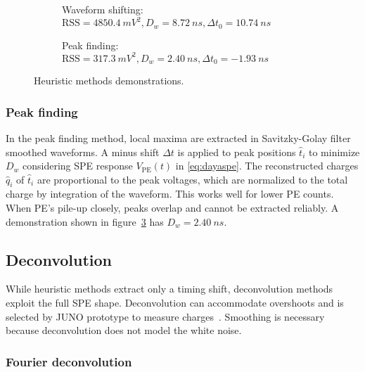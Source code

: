 \begin{figure}[H]
  \begin{subfigure}{0.5\textwidth}
    \centering
    \scalebox{0.36}{}
    \caption{\label{fig:shifting}Waveform shifting: $\mathrm{RSS}=\SI{4850.4}{mV^2},D_w=\SI{8.72}{ns},\Delta t_0=\SI{10.74}{ns}$}
  \end{subfigure}
  \begin{subfigure}{0.5\textwidth}
    \centering
    \scalebox{0.36}{}
    \caption{\label{fig:peak}Peak finding: $\mathrm{RSS}=\SI{317.3}{mV^2},D_w=\SI{2.40}{ns},\Delta t_0=\SI{-1.93}{ns}$}
  \end{subfigure}
  \caption{Heuristic methods demonstrations.}
\end{figure}

\subsubsection{Peak finding}
\label{sec:findpeak}

In the peak finding method, local maxima are extracted in Savitzky-Golay filter~\cite{savitzky_smoothing_1964} smoothed waveforms.  A minus shift $\Delta t$ is applied to peak positions $\hat{t}_i$ to minimize $D_w$ considering SPE response $V_\mathrm{PE}(t)$ in \eqref{eq:dayaspe}. The reconstructed charges $\hat{q}_i$ of $\hat{t}_i$ are proportional to the peak voltages, which are normalized to the total charge by integration of the waveform.  This works well for lower PE counts. When PE's pile-up closely, peaks overlap and cannot be extracted reliably. A demonstration shown in figure~\ref{fig:peak} has $D_w = \SI{2.40}{ns}$. 

\subsection{Deconvolution}
\label{sec:deconv}
While heuristic methods extract only a timing shift, deconvolution methods exploit the full SPE shape.  Deconvolution can accommodate overshoots and is selected by JUNO prototype to measure charges~\cite{zhang_comparison_2019}.  Smoothing is necessary because deconvolution does not model the white noise. 

\subsubsection{Fourier deconvolution}

